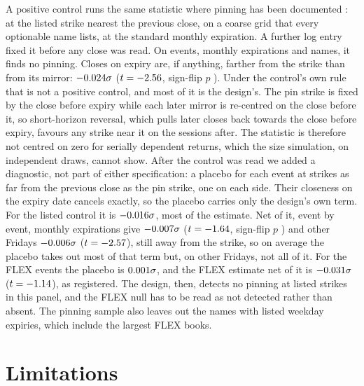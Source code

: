 \documentclass[11pt]{article}
\begin{document}
A positive control runs the same statistic where pinning has been documented
\citep{ni2005}: at the listed strike nearest the previous close, on a coarse grid that
every optionable name lists, at the standard monthly expiration. A further log entry fixed
it before any close was read. On \PinCtlEvents{} events, \PinCtlDates{} monthly
expirations and \PinCtlUnderlyings{} names, it finds no pinning. Closes on expiry are, if
anything, farther from the strike than from its mirror: $-0.024\sigma$ ($t=-2.56$,
sign-flip $p$ \PinCtlFlipP{}). Under the control's own rule that is not a positive
control, and most of it is the design's. The pin strike is fixed by the close before
expiry while each later mirror is re-centred on the close before it, so short-horizon
reversal, which pulls later closes back towards the close before expiry, favours any strike
near it on the sessions after. The statistic is therefore not centred on zero for
serially dependent returns, which the size simulation, on independent draws, cannot show.
After the control was read we added a diagnostic, not part of either specification: a
placebo for each event at strikes as far from the previous close as the pin strike, one on
each side. Their closeness on the expiry date cancels exactly, so the placebo carries only
the design's own term. For the listed control it is $-0.016\sigma$, most
of the estimate. Net of it, event by event, monthly expirations give $-0.007\sigma$
($t=-1.64$, sign-flip $p$ \PinCtlNetFlipP{}) and other Fridays
$-0.006\sigma$ ($t=-2.57$), still away from the strike, so on
average the placebo takes out most of that term but, on other Fridays, not all of it. For the FLEX events the placebo is
$0.001\sigma$, and the FLEX estimate net of it is $-0.031\sigma$
($t=-1.14$), as registered. The design, then, detects no pinning at listed strikes in
this panel, and the FLEX null has to be read as not detected rather than absent. The pinning sample also
leaves out the names with listed weekday expiries, which include the largest FLEX books.

\section{Limitations}
\end{document}
